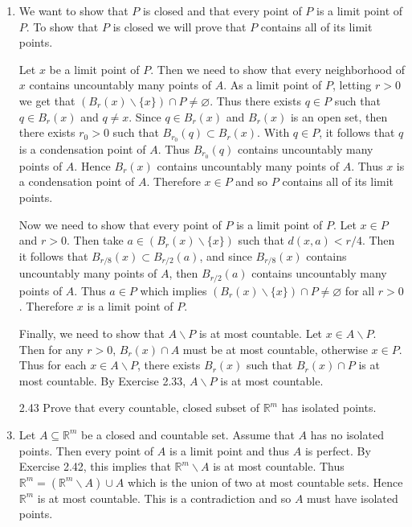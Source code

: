 \documentclass[12pt]{article}
\makeatletter
\theoremstyle{definition}
\theoremstyle{remark}
\renewenvironment{proof}[1][\proofname]{\par
  \pushQED{\qed}%
  \normalfont \topsep6\p@\@plus6\p@\relax
  \list{}{\leftmargin=0mm
          \rightmargin=4mm
          \settowidth{\itemindent}{\itshape#1}%
          \labelwidth=\itemindent
          \parsep=0pt \listparindent=\parindent 
  }
  \item[\hskip\labelsep
        \itshape
    #1\@addpunct{.}]\ignorespaces
}{%
  \popQED\endlist\@endpefalse
}
\let\oldproofname=\proofname
\renewcommand{\proofname}{\bf{\textit{\oldproofname}}}
\makeatother
\begin{document}
\begin{enumerate}[leftmargin=*]
\begin{proof}
                    We want to show that $P$ is closed and that every point of $P$ is a limit point of $P$. To show that $P$ is closed we will prove that $P$ contains all of its limit points.\par\hspace{4mm} Let $x$ be a limit point of $P$. Then we need to show that every neighborhood of $x$ contains uncountably many points of $A$. As a limit point of $P$, letting $r>0$ we get that $(B_r(x)\backslash\{x\})\cap P\neq \varnothing$. Thus there exists $q\in P$ such that $q\in B_r(x)$ and $q\neq x$. Since $q\in B_r(x)$ and $B_r(x)$ is an open set, then there exists $r_0>0$ such that $B_{r_0}(q)\subset B_r(x)$. With $q\in P$, it follows that $q$ is a condensation point of $A$. Thus $B_{r_0}(q)$ contains uncountably many points of $A$. Hence $B_r(x)$ contains uncountably many points of $A$. Thus $x$ is a condensation point of $A$. Therefore $x\in P$ and so $P$ contains all of its limit points.\par\hspace{4mm} Now we need to show that every point of $P$ is a limit point of $P$. Let $x\in P$ and $r>0$. Then take $a\in(B_r(x)\backslash\{x\})$ such that $d(x,a)<r/4$. Then it follows that $B_{r/8}(x)\subset B_{r/2}(a)$, and since $B_{r/8}(x)$ contains uncountably many points of $A$, then $B_{r/2}(a)$ contains uncountably many points of $A$. Thus $a\in P$ which implies $(B_r(x)\backslash\{x\})\cap P\neq \varnothing$ for all $r>0$. Therefore $x$ is a limit point of $P$.\par\hspace{4mm} Finally, we need to show that $A\backslash P$ is at most countable. Let $x\in A\backslash P$. Then for any $r>0$, $B_r(x)\cap A$ must be at most countable, otherwise $x\in P$. Thus for each $x\in A\backslash P$, there exists $B_r(x)$ such that $B_r(x)\cap P$ is at most countable. By Exercise 2.33, $A\backslash P$ is at most countable.
                \end{proof}
            \item[2.43] Prove that every countable, closed subset of $\mathbb{R}^m$ has isolated points.
                \begin{proof}
                    Let $A\subseteq\mathbb{R}^m$ be a closed and countable set. Assume that $A$ has no isolated points. Then every point of $A$ is a limit point and thus $A$ is perfect. By Exercise 2.42, this implies that $\mathbb{R}^m\backslash A$ is at most countable. Thus $\mathbb{R}^m=(\mathbb{R}^m\backslash A)\cup A$ which is the union of two at most countable sets. Hence $\mathbb{R}^m$ is at most countable. This is a contradiction and so $A$ must have isolated points.
                \end{proof}
        \end{enumerate}
\end{document}
